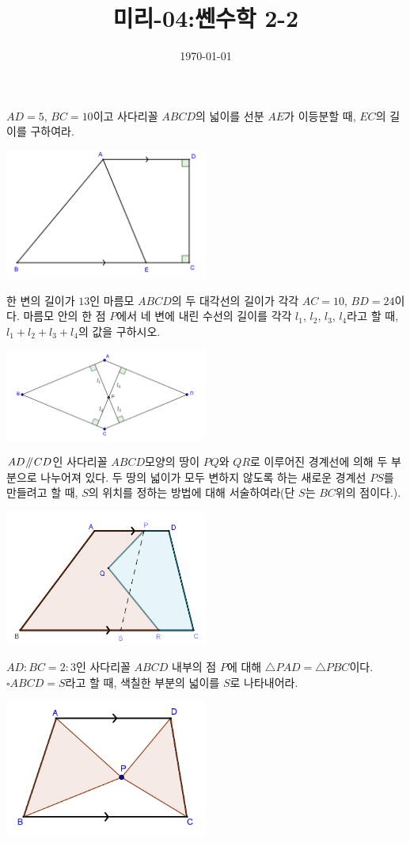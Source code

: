\documentclass{article}
\title{미리-04:쎈수학 2-2}
\date{\today}
\author{}
\newcommand{\bp}[1]
{\begin{mdframed}
[frametitle={#1},skipabove=10pt,skipbelow=10pt]}
\newcommand{\ep}{\end{mdframed}}
\newcommand{\parall}{\mathbin{\!/\mkern-5mu/\!}}
\begin{document}
\maketitle
\newpage

\bp{0686}
\(AD=5\), \(BC=10\)이고 사다리꼴 \(ABCD\)의 넓이를 선분 \(AE\)가 이등분할 때, \(EC\)의 길이를 구하여라.
\par\includegraphics[width=0.5\textwidth]{SSEN_0686}
\ep

\bp{0700}
한 변의 길이가 \(13\)인 마름모 \(ABCD\)의 두 대각선의 길이가 각각 \(AC=10\), \(BD=24\)이다.
마름모 안의 한 점 \(P\)에서 네 변에 내린 수선의 길이를 각각 \(l_1\), \(l_2\), \(l_3\), \(l_4\)라고 할 때, \(l_1+l_2+l_3+l_4\)의 값을 구하시오.
\par\includegraphics[width=0.5\textwidth]{SSEN_0700}
\ep

\bp{721}
\(AD\parall CD\)인 사다리꼴 \(ABCD\)모양의 땅이 \(PQ\)와 \(QR\)로 이루어진 경계선에 의해 두 부분으로 나누어져 있다.
두 땅의 넓이가 모두 변하지 않도록 하는 새로운 경계선 \(PS\)를 만들려고 할 때, \(S\)의 위치를 정하는 방법에 대해 서술하여라(단 \(S\)는 \(BC\)위의 점이다.).
\par\includegraphics[width=0.5\textwidth]{SSEN_0721}
\ep

\bp{722}
\(AD:BC=2:3\)인 사다리꼴 \(ABCD\) 내부의 점 \(P\)에 대해 \(\triangle PAD=\triangle PBC\)이다.
\(\square ABCD=S\)라고 할 때, 색칠한 부분의 넓이를 \(S\)로 나타내어라.
\par\includegraphics[width=0.5\textwidth]{SSEN_0722}
\ep
\end{document}
